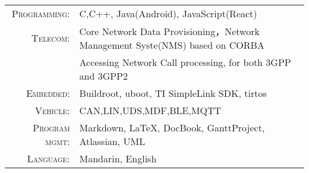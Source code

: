 %
%


 
\renewcommand{\arraystretch}{1.1}

	\begin{tabular}{>{}r>{}p{13cm}} 
		\textsc{Programming:}      & C,C++, Java(Android), JavaScript(React)\\  
		\textsc{Telecom:} 		   & Core Network Data Provisioning，Network Management Syste(NMS) based on CORBA\\
							   & Accessing Network Call processing, for both 3GPP and 3GPP2 \\
		\textsc{Embedded:}	   & Buildroot, uboot, TI SimpleLink SDK, tirtos  \\
		\textsc{Vehicle:}	   & CAN,LIN,UDS,MDF,BLE,MQTT \\
		\textsc{Program mgmt:}	   & Markdown, LaTeX, DocBook, GanttProject, Atlassian, UML \\
		\textsc{Language:}	    &  Mandarin, English \\
	\end{tabular}
	
